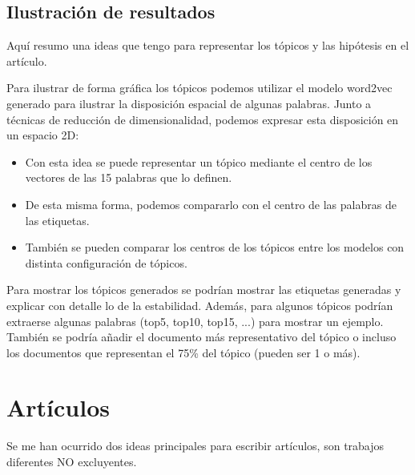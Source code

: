 \documentclass[a4paper,10pt]{article}
\begin{document}
\subsection{Ilustración de resultados}
Aquí resumo una ideas que tengo para representar los tópicos y las hipótesis en el artículo. 

Para ilustrar de forma gráfica los tópicos podemos utilizar el modelo word2vec generado para ilustrar la disposición espacial de algunas palabras. Junto a técnicas de reducción de dimensionalidad, podemos expresar esta disposición en un espacio 2D:

\begin{itemize}
	\item Con esta idea se puede representar un tópico mediante el centro de los vectores de las 15 palabras que lo definen.
	\item De esta misma forma, podemos compararlo con el centro de las palabras de las etiquetas.
	\item También se pueden comparar los centros de los tópicos entre los modelos con distinta configuración de tópicos.

\end{itemize}

Para mostrar los tópicos generados se podrían mostrar las etiquetas generadas y explicar con detalle lo de la estabilidad. Además, para algunos tópicos podrían extraerse algunas palabras (top5, top10, top15, ...) para mostrar un ejemplo. También se podría añadir el documento más representativo del tópico o incluso los documentos que representan el 75\% del tópico (pueden ser 1 o más).

\newpage
\section{Artículos}
Se me han ocurrido dos ideas principales para escribir artículos, son trabajos diferentes NO excluyentes.
\end{document}
